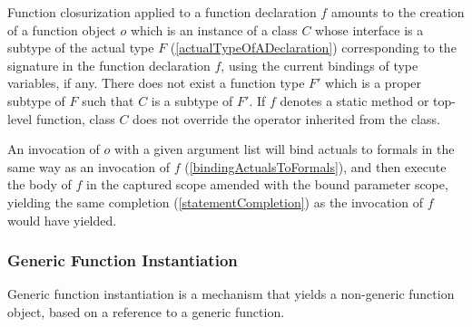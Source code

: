 \documentclass[makeidx]{article}
\begin{document}
{\LMHash{}%
Function closurization applied to a function declaration $f$
amounts to the creation of a function object $o$
which is an instance of a class $C$ whose interface is
a subtype of the actual type $F$
(\ref{actualTypeOfADeclaration})
corresponding to the signature in the function declaration $f$,
using the current bindings of type variables, if any.
There does not exist a function type $F'$ which is a proper subtype of $F$
such that $C$ is a subtype of $F'$.
If $f$ denotes a static method or top-level function,
class $C$ does not override the \lit{==} operator
inherited from the  class.


\LMHash{}%
An invocation of $o$ with a given argument list will bind actuals to formals
in the same way as an invocation of $f$
(\ref{bindingActualsToFormals}),
and then execute the body of $f$
in the captured scope amended with the bound parameter scope,
yielding the same completion
(\ref{statementCompletion})
as the invocation of $f$ would have yielded.


\subsubsection{Generic Function Instantiation}


\LMHash{}%
Generic function instantiation is a mechanism that yields
a non-generic function object,
based on a reference to a generic function.


}
\end{document}
